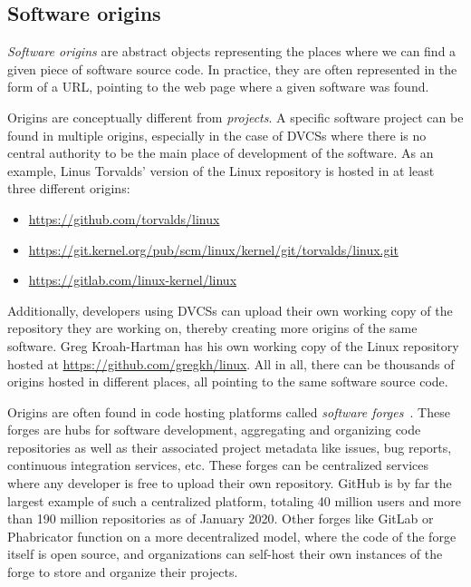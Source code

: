 \subsection{Software origins}

\emph{Software origins} are abstract objects representing the places where we
can find a given piece of software source code. In practice, they are often
represented in the form of a URL, pointing to the web page where a given
software was found.

Origins are conceptually different from \emph{projects}. A specific software
project can be found in multiple origins, especially in the case of \glspl{DVCS}
where there is no central authority to be the main place of development of the
software. As an example, Linus Torvalds' version of the Linux repository is
hosted in at least three different origins:

\begin{itemize}[ ]
    \setlength\itemsep{-0.5em}
    \item \url{https://github.com/torvalds/linux}
    \item \url{https://git.kernel.org/pub/scm/linux/kernel/git/torvalds/linux.git}
    \item \url{https://gitlab.com/linux-kernel/linux}
\end{itemize}

Additionally, developers using \glspl{DVCS} can upload their own working copy of
the repository they are working on, thereby creating more origins of the same
software. Greg Kroah-Hartman has his own working copy of the Linux repository
hosted at \url{https://github.com/gregkh/linux}. All in all, there can be
thousands of origins hosted in different places, all pointing to the same
software source code.

Origins are often found in code hosting platforms called \emph{software
forges}~\cite{squire2012describing, DBLP:conf/wikis/Squire17}. These forges are
hubs for software development, aggregating and organizing code repositories as
well as their associated project metadata like issues, bug reports, continuous
integration services, etc.  These forges can be centralized services where any
developer is free to upload their own repository. GitHub is by far the largest
example of such a centralized platform, totaling 40 million users and more than
190 million repositories as of January 2020. Other forges like GitLab or
Phabricator function on a more decentralized model, where the code of the forge
itself is open source, and organizations can self-host their own instances of
the forge to store and organize their projects.

